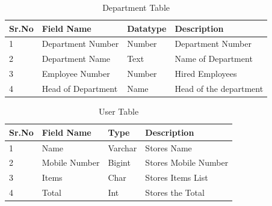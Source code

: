 \documentclass[12pt,a4paper]{report}
\begin{document}
\begin{table}[ht]
\begin{tabular}{| l | l | l | l |}
\hline
Sr.No & Field Name & Datatype & Description\\ \hline
1 & Department Number & Number & Department Number \\ \hline
2 & Department Name & Text & Name of Department \\ \hline
3 & Employee Number & Number & Hired Employees \\ \hline
4 & Head of Department & Name & Head of the department \\ \hline
\end{tabular}
\caption{Department Table}
\end{table}

\begin{table}[ht]
\begin{tabular}{| l | l | l | l |}
\hline
Sr.No & Field Name & Type & Description \\ \hline
1 & Name & Varchar & Stores Name \\ \hline
2 & Mobile Number & Bigint & Stores Mobile Number \\ \hline
3 & Items & Char & Stores Items List \\ \hline
4 & Total & Int & Stores the Total \\ \hline
\end{tabular}
\caption{User Table}
\end{table}
\end{document}
